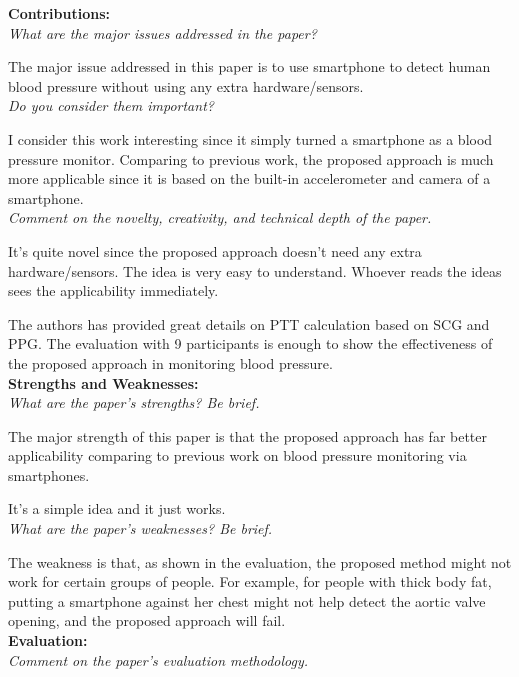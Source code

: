 \documentclass[11pt, oneside]{article}   	%
\begin{document}
\noindent \textbf{Contributions:}\\
\emph{What are the major issues addressed in the paper?}

The major issue addressed in this paper is to use smartphone to detect human blood pressure without using any extra hardware/sensors. \\


\noindent \emph{Do you consider them important?}

I consider this work interesting since it simply turned a smartphone as a blood pressure monitor. Comparing to previous work, the proposed approach is much more applicable since it is based on the built-in accelerometer and camera of a smartphone.\\


\noindent \emph{Comment on the novelty, creativity, and technical depth of the paper.}

It's quite novel since the proposed approach doesn't need any extra hardware/sensors.  The idea is very easy to understand. Whoever reads the ideas sees the applicability immediately.

The authors has provided great details on PTT calculation based on SCG and PPG. The evaluation with 9 participants is enough to show the effectiveness of the proposed approach in monitoring blood pressure.\\



\noindent \textbf{Strengths and Weaknesses:}\\
\emph{What are the paper’s strengths? Be brief.}

The major strength of this paper is that the proposed approach has far better applicability comparing to previous work on blood pressure monitoring via smartphones. 

It's a simple idea and it just works.\\


\newpage
\noindent \emph{What are the paper's weaknesses? Be brief.}

The weakness is that, as shown in the evaluation, the proposed method might not work for certain groups of people. For example, for people with thick body fat, putting a smartphone against her chest might not help detect the aortic valve opening, and the proposed approach will fail. \\


\noindent \textbf{Evaluation:}\\
\emph{Comment on the paper's evaluation methodology.}
\end{document}
